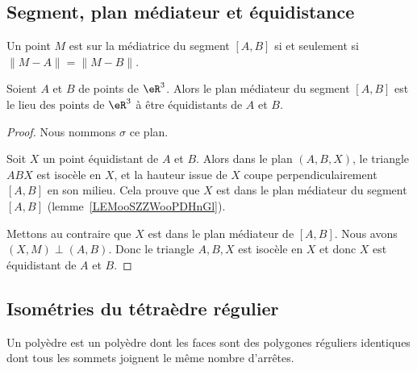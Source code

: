 \subsection{Segment, plan médiateur et équidistance}

\begin{lemma}   \label{LEMooSZZWooPDHnGl}
    Un point \( M\) est sur la médiatrice du segment \( [A,B]\) si et seulement si \( \| M-A \|=\| M-B \|\).
\end{lemma}

\begin{lemma}       \label{LEMooVBVUooOTFFXT}
    Soient \( A\) et \( B\) de points de \( \eR^3\). Alors le plan médiateur du segment \( [A,B]\) est le lieu des points de \( \eR^3\) à être équidistants de \( A\) et \( B\).
\end{lemma}

\begin{proof}
    Nous nommons \( \sigma\) ce plan.

    Soit \( X\) un point équidistant de \( A\) et \( B\). Alors dans le plan \( (A,B,X)\), le triangle \( ABX\) est isocèle en \( X\), et la hauteur issue de \( X\) coupe perpendiculairement \( [A,B]\) en son milieu. Cela prouve que \( X\) est dans le plan médiateur du segment \( [A,B]\) (lemme~\ref{LEMooSZZWooPDHnGl}).

    Mettons au contraire que \( X\) est dans le plan médiateur de \( [A,B]\). Nous avons \( (X,M)\perp (A,B)\). Donc le triangle \( A,B,X\) est isocèle en \( X\) et donc \( X\) est équidistant de \( A\) et \( B\).
\end{proof}

\subsection{Isométries du tétraèdre régulier}

\begin{definition}
    Un polyèdre  est un polyèdre dont les faces sont des polygones réguliers identiques dont tous les sommets joignent le même nombre d'arrêtes.
\end{definition}

